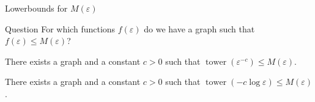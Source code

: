 \documentclass{beamer}
\DeclareMathOperator{\twr}{\mathrm{tower}}
\newcommand{\1}{\mathbbm{1}}
\newcommand{\Z}{\mathcal{Z}}
\newcommand{\eps}{\varepsilon}
\begin{document}
\begin{frame}{Lowerbounds for $M(\eps)$}
  \begin{block}{Question}
    For which functions $f(\eps)$ do we have a graph such that $f(\eps) \le M(\eps)$?
  \end{block}

  \pause
  \begin{theorem}[Gowers (1997)]
    There exists a graph and a constant $c > 0$ such that $\twr(\eps^{-c}) \le M(\eps)$.
  \end{theorem}

  \pause

  \begin{corollary}[Gowers (1997)]
    There exists a graph and a constant $c > 0$ such that $\twr(-c\log \eps) \le
      M(\eps)$.
  \end{corollary}
\end{frame}






\end{document}
